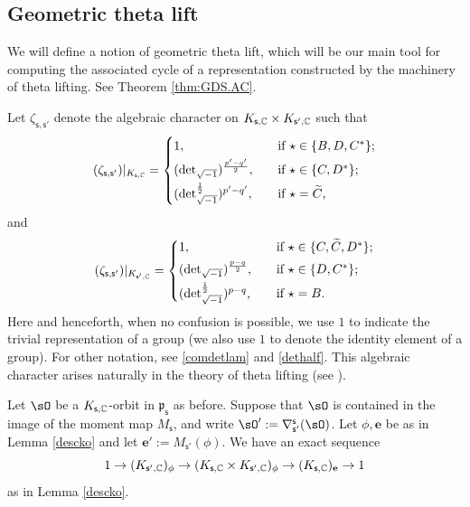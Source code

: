 \documentclass[11pt,a4paper]{amsart}
\newcommand{\p}{\mathfrak p}
\numberwithin{equation}{section}
\theoremstyle{remark}
\begin{document}
\subsection{Geometric theta lift} \label{sec:dlift}
We will define a notion of geometric theta lift, which will be our main tool for computing the associated cycle of a representation 
constructed by the machinery of theta lifting. See Theorem \ref{thm:GDS.AC}.


Let $\zeta_{\mathsf s, \mathsf s'}$ denote the algebraic character on $K_{\mathsf s, \mathbb{C}}\times K_{\mathsf s', \mathbb{C}}$  such that
\[
 (\zeta_{\mathsf s, \mathsf s'})|_{K_{\mathsf s, \C}}=
   \begin{cases}
    1, \quad & \textrm{if $\star\in \{B, D, C^*\}$}; \smallskip\\
      ({\det}_{\sqrt{-1}})^{\frac{p'-q'}{2}}, \quad & \textrm{if $\star\in \{C, D^*\}$};\smallskip\\
     ({\det}_{\sqrt{-1}}^{\frac{1}{2}})^{p'-q'}, \quad & \textrm{if $\star=\widetilde C$,}\\
  \end{cases}
\]
and
\[
 (\zeta_{\mathsf s, \mathsf s'})|_{K_{\mathsf s', \C}}=
   \begin{cases}
    1, \quad & \textrm{if $\star\in \{C, \widetilde C, D^*\}$}; \smallskip\\
      ({\det}_{\sqrt{-1}})^{\frac{p-q}{2}}, \quad & \textrm{if $\star\in \{D, C^*\}$};\smallskip\\
     ({\det}_{\sqrt{-1}}^{\frac{1}{2}})^{p-q}, \quad & \textrm{if $\star=B$}.
 \end{cases}
\]
Here and henceforth, when no confusion is possible, we  use $1$ to indicate the trivial representation of a group (we also use $1$ to denote the identity element of a group). For other notation, see 
\eqref{comdetlam} and \eqref{dethalf}. This algebraic character arises naturally in the theory of theta lifting  (see ). 

Let  $\sO$ be a $K_{\mathsf s, \mathbb{C}}$-orbit in $\p_{\mathsf s}$ as before. Suppose that $\sO$ is contained in the image of the moment map $M_{\mathsf s}$, and write $\sO':=\nabla^{\mathsf s}_{\mathsf s'}(\sO)$.
Let $\phi,\mathbf e$ be as in Lemma  \ref{descko} and let $\mathbf e':=M_{\mathsf s'}(\phi)$. We have an exact sequence
\[
  1\rightarrow  (K_{\mathsf s',\mathbb{C}})_\phi\rightarrow (K_{\mathsf s,\mathbb{C}}\times K_{\mathsf s', \mathbb{C}})_\phi\rightarrow (K_{\mathsf s,\mathbb{C}})_{\mathbf e}\rightarrow 1
\]
as in Lemma  \ref{descko}.
\end{document}
